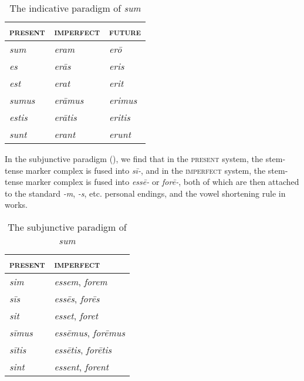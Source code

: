 \documentclass[a4paper, oneside]{report}
\newcommand{\corpus}[1]{\emph{#1}}
\newcommand*{\category}[1]{\textsc{#1}}
\begin{document}
\begin{table}[H]
    \caption{The indicative paradigm of \corpus{sum}}
    \label{tbl:indicative-sum}
    \centering
    \begin{tabular}{lll}
    \toprule
    \category{present} & \category{imperfect}  & \category{future}  \\
    \midrule
    \corpus{sum}     & \corpus{eram}       & \corpus{er\={o}} \\
    \corpus{es}      & \corpus{er\={a}s}   & \corpus{eris}    \\
    \corpus{est}     & \corpus{erat}       & \corpus{erit}    \\
    \corpus{sumus}   & \corpus{er\={a}mus} & \corpus{erimus}  \\
    \corpus{estis}   & \corpus{er\={a}tis} & \corpus{eritis}  \\
    \corpus{sunt}    & \corpus{erant}      & \corpus{erunt}   \\ \bottomrule
    \end{tabular}
\end{table}

In the subjunctive paradigm (),
we find that in the \category{present} system, 
the stem-tense marker complex is fused into \corpus{sī-},
and in the \category{imperfect} system,
the stem-tense marker complex is fused into \corpus{ess\={e}-} or \corpus{for\={e}-},
both of which are then attached to the standard \corpus{-m}, \corpus{-s}, etc. 
personal endings, 
and the vowel shortening rule in  works.

\begin{table}[H]
    \caption{The subjunctive paradigm of \corpus{sum}}
    \centering
    \label{tbl:subjunctive-sum}
    \begin{tabular}{ll}
    \toprule
    \category{present}   & \category{imperfect}   \\ \midrule
    \corpus{sim}       & \corpus{essem}, \corpus{forem}       \\
    \corpus{sīs}   & \corpus{ess\={e}s}, \corpus{for\={e}s}   \\
    \corpus{sit}       & \corpus{esset}, \corpus{foret}       \\
    \corpus{sīmus} & \corpus{ess\={e}mus}, \corpus{for\={e}mus} \\
    \corpus{sītis} & \corpus{ess\={e}tis}, \corpus{for\={e}tis} \\
    \corpus{sint}      & \corpus{essent}, \corpus{forent}     \\ \bottomrule
    \end{tabular}
\end{table}
\end{document}
